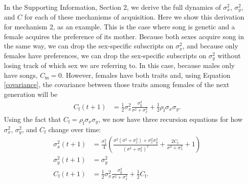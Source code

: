 \documentclass[12pt]{article}
\newcommand{\x}[1]{\text{#1}}
\begin{document}
In the Supporting Information, Section 2, we derive the full dynamics of $\sigma_x^2$, $\sigma_y^2$, and $C$ for each of these mechanisms of acquisition. Here we show this derivation for mechanism 2, as an example. This is the case where song is genetic and a female acquires the preference of its mother. Because both sexes acquire song in the same way, we can drop the sex-specific subscripts on $\sigma_x^2$, and because only females have preferences, we can drop the sex-specific subscripts on $\sigma_y^2$ without losing track of which sex we are referring to. In this case, because males only have songs, $C_\x{m}=0$. However, females have both traits and, using Equation \ref{covariance}, the covariance between those traits among females of the next generation will be 
\begin{align*}
C_\x{f}(t+1)&=\frac{1}{2}\sigma_{x}^2\frac{\sigma_{y}^2}{\sigma^2+\sigma_{x}^2}+\frac{1}{2}\rho_\x{f}\sigma_{x}\sigma_{y}.
\end{align*} 
Using the fact that $C_\x{f}=\rho_\x{f}\sigma_{x}\sigma_{y}$, we now have three recursion equations for how $\sigma_{x}^2$, $\sigma_{y}^2$, and $C_\x{f}$ change over time:
\begin{align*}
\sigma_x^2(t+1)&=\frac{\sigma_x^2}{4}\left(\frac{\sigma^2(\sigma^2+\sigma_{x}^2)+\sigma_{x}^2\sigma_{y}^2}{(\sigma^2+\sigma_{x}^2)^2}+\frac{2C_\x{f}}{\sigma^2+\sigma_x^2}+1\right)
\\ \sigma_y^2(t+1)&=\sigma_y^2
\\ C_\x{f}(t+1)&=\frac{1}{2}\sigma_{x}^2\frac{\sigma_{y}^2}{\sigma^2+\sigma_{x}^2}+\frac{1}{2}C_\x{f}.
\end{align*}
\end{document}

